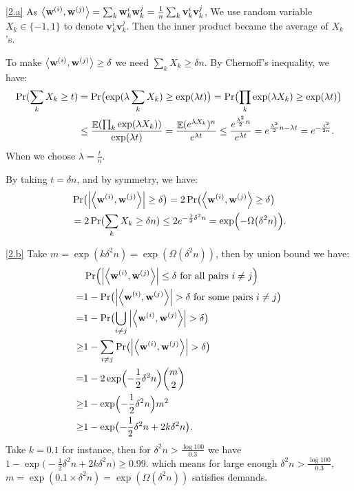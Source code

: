 \documentclass{homework}
\begin{document}
\begin{solution}
\ref{2.a}
As $\left\langle\mathbf{w}^{(i)},\mathbf{w}^{(j)}\right\rangle = \sum_{k} \mathbf{w}^{i}_{k} \mathbf{w}^{j}_{k} = \frac{1}{n} \sum_{k} \mathbf{v}^{i}_{k} \mathbf{v}^{j}_{k}$, We use random variable $X_k\in\{-1,1\}$ to denote $\mathbf{v}^{i}_{k} \mathbf{v}^{j}_{k}$. Then the inner product became the average of $X_k$'s. 

To make $\left\langle\mathbf{w}^{(i)},\mathbf{w}^{(j)}\right\rangle\ge \delta$ we need $\sum_k X_k\ge \delta n$. By Chernoff's inequality, we have:
\begin{align*}
  \Pr(\sum_k X_k\ge t)&= \Pr\bigl(\exp(\lambda\sum_k X_k)\ge \exp(\lambda t)\bigr)
  = \Pr\bigl(\prod_k \exp(\lambda X_k)\ge \exp(\lambda t)\bigr)\\
  &\le \frac{\mathop{\mathbb{E}}\displaylimits(\prod_k \exp(\lambda X_k))}{\exp(\lambda t)}
  = \frac{\mathop{\mathbb{E}}\displaylimits(e^{\lambda X_k})^n}{e^{\lambda t}}
  \le \frac{e^{\frac{\lambda^2}{2}n}}{e^{\lambda t}} 
  = e^{\frac{\lambda^2}{2}n-\lambda t} = e^{-\frac{t^2}{2n}}.
\end{align*}
When we choose $\lambda = \frac{t}{n}$.

By taking $t=\delta n$, and by symmetry, we have:
\begin{align*}
  &\Pr \bigl( \left\lvert \left\langle\mathbf{w}^{(i)},\mathbf{w}^{(j)}\right\rangle \right\rvert \ge \delta \bigr) = 2\Pr \bigl( {\left\langle\mathbf{w}^{(i)},\mathbf{w}^{(j)}\right\rangle}\ge \delta \bigr) \\
  &= 2\Pr(\sum_k X_k\ge \delta n) \le 2e^{-\frac{1}{2}\delta^2 n} = \exp \Bigl( - \Omega \bigl( \delta^{2} n \bigr) \Bigr).
\end{align*}

\ref{2.b}
Take $m = \exp(k\delta^2 n) = \exp(\Omega (\delta^2 n))$, then by union bound we have:
\begin{align*}
  &\Pr \Bigl( \left\lvert \left\langle\mathbf{w}^{(i)},\mathbf{w}^{(j)}\right\rangle \right\rvert
  \le \delta \text{ for all pairs } i\ne j\Bigr) \\
  =& 1 - \Pr \bigl( \left\lvert \left\langle\mathbf{w}^{(i)},\mathbf{w}^{(j)}\right\rangle \right\rvert>\delta \text{ for some pairs }i\ne j \bigr)\\
  =& 1 - \Pr\bigl(\bigcup_{i\ne j}\left\lvert \left\langle\mathbf{w}^{(i)},\mathbf{w}^{(j)}\right\rangle \right\rvert>\delta\bigr)\\
  \ge & 1 - \sum_{i\ne j}\Pr\bigl(\left\lvert \left\langle\mathbf{w}^{(i)},\mathbf{w}^{(j)}\right\rangle \right\rvert>\delta\bigr)\\
  =& 1 - 2\exp \Bigl( -\frac{1}{2}\delta^{2} n \Bigr){\binom{m}{2}}\\
  \ge& 1 - \exp \Bigl( -\frac{1}{2}\delta^{2} n \Bigr)m^2\\
  \ge& 1-\exp\bigl(-\frac{1}{2}\delta^2 n + 2k\delta^2 n\bigr).
\end{align*}
Take $k=0.1$ for instance, then for $\delta^2 n > \frac{\log 100}{0.3}$ we have $1-\exp\bigl(-\frac{1}{2}\delta^2 n + 2k\delta^2 n\bigr)\ge 0.99$. which means for large enough $\delta^2 n > \frac{\log 100}{0.3}$, $m = \exp(0.1\times \delta^2 n) = \exp(\Omega (\delta^2 n))$ satisfies demands. 

\end{solution}
\end{document}
